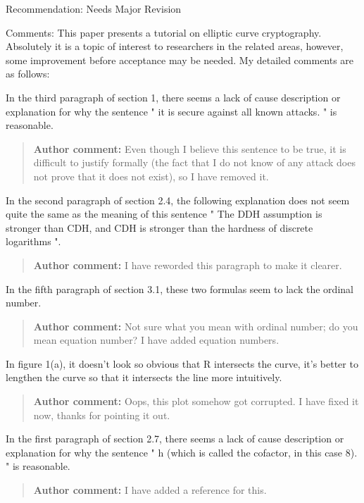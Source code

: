\documentclass[10pt]{article}
\newcommand{\authorcomment}[1]{\begin{quote}\textbf{Author comment:} #1\end{quote}}
\begin{document}
\begin{spverbatim}
Recommendation: Needs Major Revision

Comments:
This paper presents a tutorial on elliptic curve cryptography. Absolutely it is a topic of interest to researchers in the related areas, however, some improvement before acceptance may be needed. My detailed comments are as follows:

In the third paragraph of section 1, there seems a lack of cause description or explanation for why the sentence " it is secure against all known attacks. " is reasonable.
\end{spverbatim}
\authorcomment{Even though I believe this sentence to be true, it is difficult to justify formally (the fact that I do not know of any attack does not prove that it does not exist), so I have removed it.}
\begin{spverbatim}
In the second paragraph of section 2.4, the following explanation does not seem quite the same as the meaning of this sentence " The DDH assumption is stronger than CDH, and CDH is stronger than the hardness of discrete logarithms ".
\end{spverbatim}
\authorcomment{I have reworded this paragraph to make it clearer.}
\begin{spverbatim}
In the fifth paragraph of section 3.1, these two formulas seem to lack the ordinal number.
\end{spverbatim}
\authorcomment{Not sure what you mean with ordinal number; do you mean equation number? I have added equation numbers.}
\begin{spverbatim}
In figure 1(a), it doesn't look so obvious that R intersects the curve, it's better to lengthen the curve so that it intersects the line more intuitively.
\end{spverbatim}
\authorcomment{Oops, this plot somehow got corrupted. I have fixed it now, thanks for pointing it out.}
\begin{spverbatim}
In the first paragraph of section 2.7, there seems a lack of cause description or explanation for why the sentence " h (which is called the cofactor, in this case 8). " is reasonable.
\end{spverbatim}
\authorcomment{I have added a reference for this.}
\end{document}

